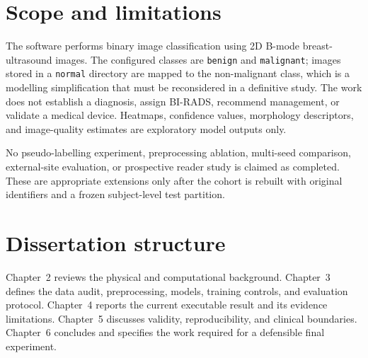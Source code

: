 \section{Scope and limitations}
The software performs binary image classification using 2D B-mode breast-ultrasound images. The configured classes are \texttt{benign} and \texttt{malignant}; images stored in a \texttt{normal} directory are mapped to the non-malignant class, which is a modelling simplification that must be reconsidered in a definitive study. The work does not establish a diagnosis, assign BI-RADS, recommend management, or validate a medical device. Heatmaps, confidence values, morphology descriptors, and image-quality estimates are exploratory model outputs only.

No pseudo-labelling experiment, preprocessing ablation, multi-seed comparison, external-site evaluation, or prospective reader study is claimed as completed. These are appropriate extensions only after the cohort is rebuilt with original identifiers and a frozen subject-level test partition.

\section{Dissertation structure}
Chapter~2 reviews the physical and computational background. Chapter~3 defines the data audit, preprocessing, models, training controls, and evaluation protocol. Chapter~4 reports the current executable result and its evidence limitations. Chapter~5 discusses validity, reproducibility, and clinical boundaries. Chapter~6 concludes and specifies the work required for a defensible final experiment.
